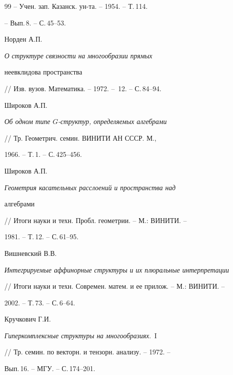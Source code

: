 \begin{thebibliography}{99}
-- Учен. зап. Казанск. ун-та. -- 1954. -- Т.\,114.


-- Вып.\,8. -- С.\,45--53.







Норден А.П.


{\it О структуре связности на многообразии прямых


неевклидова пространства}


// Изв. вузов. Математика. -- 1972. -- \No\,12. -- С.\,84--94.







Широков А.П.


{\it Об одном типе $G$-структур, определяемых алгебрами}


// Тр. Геометрич. семин.  ВИНИТИ АН СССР. М.,


1966. -- Т.\,1. -- С.\,425--456.







Широков А.П.


{\it Геометрия касательных расслоений и пространства над


алгебрами}


// Итоги науки и техн. Пробл. геометрии. -- М.: ВИНИТИ. --


1981. -- Т.\,12. --  С.\,61--95.







Вишневский В.В.


{\it Интегрируемые аффинорные структуры и их плюральные интерпретации}


// Итоги науки и техн. Современ. матем. и ее прилож. -- М.: ВИНИТИ. --


2002. -- Т.\,73. -- С.\,6--64.







Кручкович Г.И.


{\it Гиперкомплексные структуры на  многообразиях}.~I


// Тр. семин. по векторн. и тензорн. анализу. -- 1972. -- 


Вып.\,16. -- МГУ. -- С.\,174--201.






\end{thebibliography}
